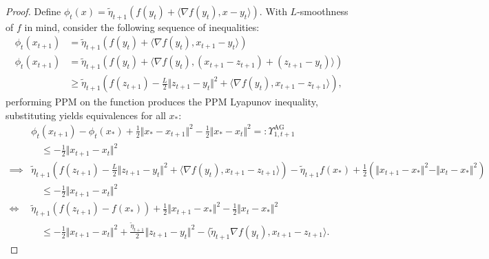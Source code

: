 \documentclass[12pt]{article}
\begin{document}
        \begin{proof}
            Define $\phi_t(x) = \tilde \eta_{t +1}(f(y_t) + \langle \nabla f(y_t), x- y_t\rangle)$.  
            With $L$-smoothness of $f$ in mind, consider the following sequence of inequalities: 
            $$
            \begin{aligned}
                \phi_t(x_{t + 1}) 
                &= 
                \tilde\eta_{t + 1} (f(y_t) + \langle \nabla f(y_t), x_{t + 1} - y_t\rangle)
                \\
                \phi_t (x_{t + 1}) &= \tilde \eta_{t + 1}(
                    f(y_t) + \langle \nabla f(y_t), (x_{t +1} - z_{t + 1}) + (z_{t + 1} - y_t) \rangle
                )
                \\
                &\ge 
                \tilde \eta_{t + 1}
                \left(
                    f(z_{t + 1}) - \frac{L}{2} \Vert z_{t + 1} - y_t\Vert^2 + 
                    \langle \nabla f(y_t), x_{t +1} - z_{t + 1}\rangle
                \right), 
            \end{aligned}
            $$
            performing PPM on the function produces the PPM Lyapunov inequality, substituting yields equivalences for all $x_*$: 
            {\footnotesize
            \begin{align*}
                & \phi_t(x_{t + 1}) - \phi_t(x_*) + \frac{1}{2}\Vert x_* - x_{t + 1}\Vert^2 
                - \frac{1}{2}\Vert x_* - x_t\Vert^2 
                =: \Upsilon_{1, t + 1}^{\text{AG}}
                \\
                &\quad \le 
                - \frac{1}{2} \Vert x_{t + 1} - x_t\Vert^2 
                \\
                \implies & 
                \tilde \eta_{t + 1}\left(
                    f(z_{t + 1}) - \frac{L}{2}\Vert z_{t + 1} - y_t\Vert^2 
                    + 
                    \langle \nabla f(y_t), x_{t + 1} - z_{t + 1}\rangle
                \right) - \tilde \eta_{t + 1} f(x_*)
                + 
                \frac{1}{2}\left(
                    \Vert x_{t + 1} - x_*\Vert^2 - \Vert x_{t} - x_*\Vert^2
                \right)
                \\
                &\quad \le
                 - \frac{1}{2}\Vert x_{t + 1} - x_t\Vert^2 
                \\
                \iff 
                & 
                \tilde \eta_{t + 1} \left(
                    f(z_{t + 1}) - f(x_*)
                \right) + \frac{1}{2}\Vert x_{t + 1} - x_*\Vert^2 
                - \frac{1}{2}\Vert x_{t} - x_*\Vert^2 
                \\
                &\quad \le 
                -\frac{1}{2} \Vert x_{t + 1 } - x_t\Vert^2 + 
                \frac{\tilde \eta_{t + 1}}{2}\Vert z_{t + 1} - y_t\Vert^2 
                - \langle \tilde \eta_{t + 1}\nabla f(y_t), x_{t + 1} - z_{t + 1} \rangle. 
            \end{align*}
            }


\end{proof}
\end{document}
